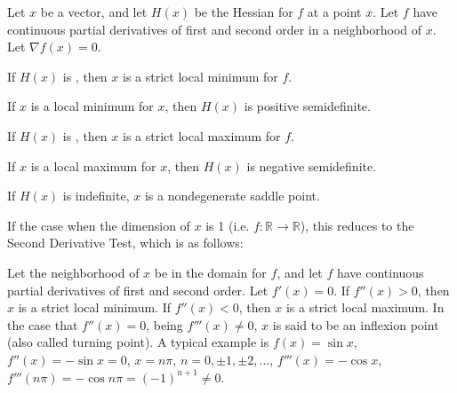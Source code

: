 \documentclass[12pt]{article}
\begin{document}
Let $x$ be a vector, and let $H(x)$ be the Hessian for $f$ at a point $x$.  Let $f$ have continuous partial derivatives 
of first and second order in a neighborhood of $x$. Let $\nabla f (x)= 0$.

If $H(x)$ is , then $x$ is a strict local minimum for $f$. 

If $x$ is a local minimum for $x$, then $H(x)$ is positive semidefinite.


If $H(x)$ is , then $x$ is a strict local maximum for $f$. 

If $x$ is a local maximum for $x$, then $H(x)$ is negative semidefinite.

If $H(x)$ is indefinite, $x$ is a nondegenerate saddle point.

If the case when the dimension of $x$ is 1 (i.e. $f: \mathbb{R} \to \mathbb{R}$), this reduces to the Second Derivative Test, which is as follows:

Let the neighborhood of $x$ be in the domain for $f$, and let $f$ have continuous partial derivatives of first and second order. 
Let $f'(x) = 0$. If $f''(x) > 0$, then $x$ is a strict local minimum. If $f''(x) < 0$, then $x$ is a strict local maximum. In the case that $f''(x)=0$, being $f'''(x)\neq 0$, $x$ is said to be an inflexion point (also called turning point). A typical example is $f(x)=\sin x$, $f''(x)=-\sin x=0$, $x=n\pi$, $n=0, \pm 1, \pm 2, \dots$, 
$f'''(x)=-\cos x$, $f'''(n\pi)=-\cos n\pi=(-1)^{n+1}\neq 0$.
\end{document}
